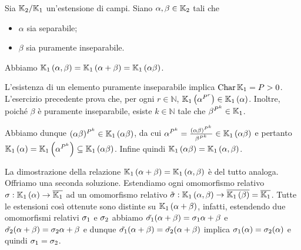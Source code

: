 \begin{Theorem}
	Sia $\mathbb{K}_2/\mathbb{K}_1$ un'estensione di campi. Siano $\alpha, \beta \in \mathbb{K}_2$ tali che
	\begin{itemize}
		\item $\alpha$ sia separabile;
		\item $\beta$ sia puramente inseparabile.
	\end{itemize}
	Abbiamo $\mathbb{K}_1 \left ( \alpha,\beta \right ) = \mathbb{K}_1 \left ( \alpha + \beta \right ) = \mathbb{K}_1 \left ( \alpha\beta \right )$.
\end{Theorem}
\Proof L'esistenza di un elemento puramente inseparabile implica $\operatorname{Char}{\mathbb{K}_1} = P > 0$. L'esercizio precedente prova che, per ogni $r \in \mathbb{N}$, $\mathbb{K}_1 \left ( \alpha^{P^r} \right ) \in \mathbb{K}_1 \left ( \alpha \right )$. Inoltre, poich\'e $\beta$ \`e puramente inseparabile, esiste $k \in \mathbb{N}$ tale che $\beta^{P^k} \in \mathbb{K}_1$.
\par Abbiamo dunque $(\alpha\beta)^{P^k} \in \mathbb{K}_1 \left ( \alpha\beta \right )$, da cui $\alpha^{P^k} = \frac{(\alpha\beta)^{P^k}}{\beta^{P^k}} \in \mathbb{K}_1 \left ( \alpha\beta \right )$ e pertanto $\mathbb{K}_1 \left ( \alpha \right ) = \mathbb{K}_1 \left ( \alpha^{P^k} \right ) \subseteq \mathbb{K}_1 \left ( \alpha\beta \right )$. Infine quindi $\mathbb{K}_1 \left ( \alpha\beta \right ) = \mathbb{K}_1 \left ( \alpha, \beta \right )$.
\par La dimostrazione della relazione $\mathbb{K}_1 \left ( \alpha + \beta \right ) = \mathbb{K}_1 \left ( \alpha, \beta \right )$ \`e del tutto analoga. \EndProof
\\\Proof Offriamo una seconda soluzione. Estendiamo ogni omomorfismo relativo $\sigma: \mathbb{K}_1 \left ( \alpha \right ) \rightarrow \overline{\mathbb{K}_1}$ ad un omomorfismo relativo $\tilde{\sigma}: \mathbb{K}_1 \left ( \alpha,\beta \right ) \rightarrow \overline{\mathbb{K}_1 \left ( \beta \right )} = \overline{\mathbb{K}_1}$. Tutte le estensioni cos\`i ottenute sono distinte su $\mathbb{K}_1 \left ( \alpha + \beta \right )$, infatti, estendendo due omomorfismi relativi $\sigma_1$ e $\sigma_2$ abbiamo $\tilde{\sigma_1}(\alpha + \beta) = \sigma_1{\alpha} + \beta$ e $\tilde{\sigma_2}(\alpha + \beta) = \sigma_2{\alpha} + \beta$ e dunque $\tilde{\sigma_1}(\alpha + \beta) = \tilde{\sigma_2}(\alpha + \beta)$ implica $\sigma_1(\alpha) = \sigma_2(\alpha)$ e quindi $\sigma_1 = \sigma_2$.
